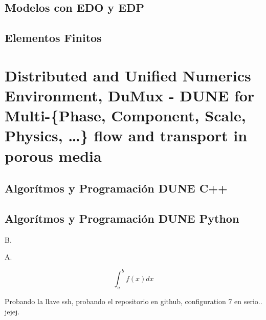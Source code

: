 \documentclass[10pt,
	a4paper,
	spanish,
	titlepage=firstiscover,
	titlepage=true,
	BCOR=2cm,
	DIV=12
]{scrbook}
\begin{document}
\begin{refsection}
	\chapter{Modelos con EDO y EDP}
	
	\chapter{Elementos Finitos}
	\part{Distributed and Unified Numerics Environment, DuMux - DUNE for Multi-\{Phase, Component, Scale, Physics, \dots\} flow and transport in porous media} %
	\chapter{Algorítmos y Programación DUNE C++} %
	\chapter{Algorítmos y Programación DUNE Python}

	B.\cite{Reilly}

	\printbibliography[
	title={Referencias},
	heading=bibintoc]
	\nocite{*}
	\printbibliography[
	title={Bibliografía},
	heading=none,keyword=paper]
\end{refsection}

A.

$$\int_a^b f(x)dx$$

Probando la llave ssh, probando el repositorio en github, configuration 7 en serio.. jejej.

\printindex
\end{document}
